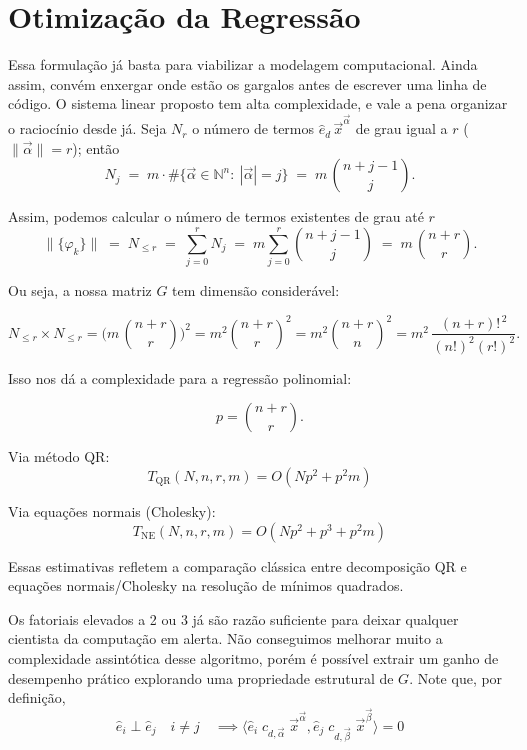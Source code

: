 \section{Otimização da Regressão}

Essa formulação já basta para viabilizar a modelagem computacional.
Ainda assim, convém enxergar onde estão os gargalos antes de escrever uma linha
de código.
O sistema linear proposto tem alta complexidade, e vale a pena organizar o
raciocínio desde já.
Seja $N_r$ o número de termos $\hat{e}_d\,\vec{x}^{\vec{\alpha}}$ de grau
igual a $r$ ($\|\vec{\alpha}\| = r$); então
\begin{equation*}
    N_j
    \; = \;
    m \cdot \#\{\vec{\alpha}\in\mathbb{N}^n:\ |\vec{\alpha}|=j\}
    \; = \;
    m\,\binom{n+j-1}{j}.
\end{equation*}

Assim, podemos calcular o número de termos existentes de grau até $r$
\begin{equation*}
    \| \{ \varphi_k \}\|
    \;=\;
    N_{\le r}
    \;=\;
    \sum_{j=0}^{r} N_j
    \;=\;
    m \sum_{j=0}^{r} \binom{n+j-1}{j}
    \;=\;
    m\,\binom{n+r}{r}.
\end{equation*}

Ou seja, a nossa matriz $G$ tem dimensão considerável:

\begin{equation*}
    N_{\le r} \times N_{\le r}
    = \bigl(m\,\binom{n+r}{r}\bigr)^2
    = m^2 \binom{n+r}{r}^2
    = m^2 \binom{n+r}{n}^2
    = m^2\,\frac{(n+r)!^{\,2}}{(n!)^{2}(r!)^{2}}.
\end{equation*}

Isso nos dá a complexidade para a regressão polinomial:

\[
    p=\binom{n+r}{r}.
\]

Via método QR:
\[
    T_{\mathrm{QR}}(N,n,r,m)=O\!\left(Np^{2}+p^{2}m\right)
\]

Via equações normais (Cholesky):
\[
    T_{\mathrm{NE}}(N,n,r,m)=O\!\left(Np^{2}+p^{3}+p^{2}m\right)
\]

Essas estimativas refletem a comparação clássica entre decomposição QR e
equações normais/Cholesky na resolução de mínimos
quadrados\cite{burden_faires_2011,franco_calculo_numerico_2006}.

Os fatoriais elevados a 2 ou 3 já são razão suficiente para deixar qualquer
cientista da computação em alerta.
Não conseguimos melhorar muito a complexidade assintótica desse algoritmo,
porém é possível extrair um ganho de desempenho prático explorando uma
propriedade estrutural de $G$.
Note que, por definição,
$$
\hat e_i \perp \hat e_j \quad i \ne j \quad \implies
\langle \hat e_i \; c_{d,\vec{\alpha}} \; \vec x ^{\vec \alpha},
\hat e_j \; c_{d,\vec{\beta}} \; \vec x^{\vec \beta}\rangle = 0
$$

